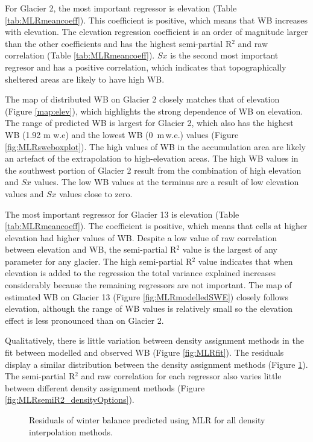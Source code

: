 \documentclass{sfuthesis}
\begin{document}
{For Glacier 2, the most important regressor is elevation (Table \ref{tab:MLRmeancoeff}). This coefficient is positive, which means that WB increases with elevation. The elevation regression coefficient is an order of magnitude larger than the other coefficients and has the highest semi-partial R$^2$ and raw correlation (Table \ref{tab:MLRmeancoeff}). $Sx$ is the second most important regresor and has a positive correlation, which indicates that topographically sheltered areas are likely to have high WB. 

The map of distributed WB on Glacier 2 closely matches that of elevation (Figure \ref{map:elev}), which highlights the strong dependence of WB on elevation. The range of predicted WB is largest for Glacier 2, which also has the highest WB (1.92 m w.e) and the lowest WB (0 \,m\,w.e.) values (Figure \ref{fig:MLRsweboxplot}). The high values of WB in the accumulation area are likely an artefact of the extrapolation to high-elevation areas. The high WB values in the southwest portion of Glacier 2 result from the combination of high elevation and $Sx$ values. The low WB values at the terminus are a result of low elevation values and $Sx$ values close to zero. 

The most important regressor for Glacier 13 is elevation (Table \ref{tab:MLRmeancoeff}). The coefficient is positive, which means that cells at higher elevation had higher values of WB. Despite a low value of raw correlation between elevation and WB, the semi-partial R$^2$ value is the largest of any parameter for any glacier. The high semi-partial R$^2$ value indicates that when elevation is added to the regression the total variance explained increases considerably because the remaining regressors are not important. The map of estimated WB on Glacier 13 (Figure \ref{fig:MLRmodelledSWE}) closely follows elevation, although the range of WB values is relatively small so the elevation effect is less pronounced than on Glacier 2. 

Qualitatively, there is little variation between density assignment methods in the fit between modelled and observed WB (Figure \ref{fig:MLRfit}). The residuals display a similar distribution between the density assignment methods (Figure \ref{fig:MLRresiduals_all}). The semi-partial R$^2$ and raw correlation for each regressor also varies little between different density assignment methods (Figure \ref{fig:MLRsemiR2_densityOptions}).


\begin{figure}[H]
	\caption{Residuals of winter balance predicted using MLR for all density interpolation methods.}
	\label{fig:MLRresiduals_all}
\end{figure}

}
\end{document}
